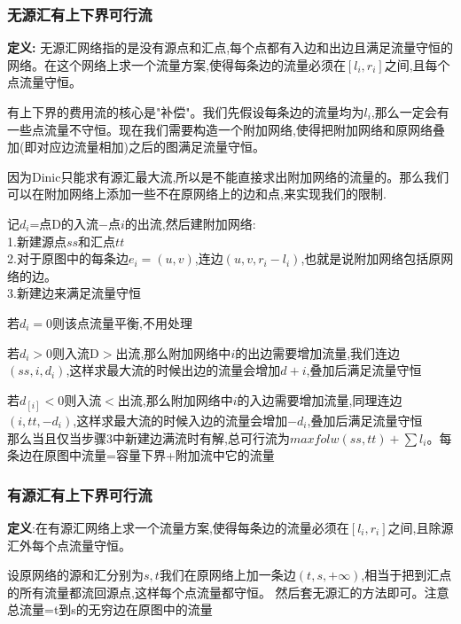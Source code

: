 \documentclass[12pt, a4paper, oneside]{ctexart}
\begin{document}
\subsubsection{无源汇有上下界可行流}
\textbf{定义:} 无源汇网络指的是没有源点和汇点,每个点都有入边和出边且满足流量守恒的网络。在这个网络上求一个流量方案,使得每条边的流量必须在$[l_{i},r_{i}]$之间,且每个点流量守恒。\par
有上下界的费用流的核心是"补偿"。我们先假设每条边的流量均为$l_{i}$,那么一定会有一些点流量不守恒。现在我们需要构造一个附加网络,使得把附加网络和原网络叠加(即对应边流量相加)之后的图满足流量守恒。\par
因为Dinic只能求有源汇最大流,所以是不能直接求出附加网络的流量的。那么我们可以在附加网络上添加一些不在原网络上的边和点,来实现我们的限制.\par
记$d_{i}$=点D的入流−点$i$的出流,然后建附加网络:\\
1.新建源点$ss$和汇点$tt$\\
2.对于原图中的每条边$e_{i}=(u,v)$,连边$(u,v,r_{i}-l_{i})$,也就是说附加网络包括原网络的边。\\
3.新建边来满足流量守恒\par
若$d_{i}=0$则该点流量平衡,不用处理\par
若$d_{i}>0$则入流D$>$出流,那么附加网络中$i$的出边需要增加流量,我们连边$(ss,i,d_{i})$,这样求最大流的时候出边的流量会增加$d+{i}$,叠加后满足流量守恒\par
若$d_[i]<0$则入流$<$出流,那么附加网络中$i$的入边需要增加流量,同理连边$(i,tt,-d_{i})$,这样求最大流的时候入边的流量会增加$-d_{i}$,叠加后满足流量守恒\\
那么当且仅当步骤3中新建边满流时有解,总可行流为$maxfolw(ss,tt)+\sum{l_{i}}$。每条边在原图中流量=容量下界+附加流中它的流量

\subsubsection{有源汇有上下界可行流}
\textbf{定义}:在有源汇网络上求一个流量方案,使得每条边的流量必须在$[l_{i},r_{i}]$之间,且除源汇外每个点流量守恒。\par
设原网络的源和汇分别为$s,t$我们在原网络上加一条边${(t,s,+\infty)}$,相当于把到汇点的所有流量都流回源点,这样每个点流量都守恒。
然后套无源汇的方法即可。注意总流量=t到s的无穷边在原图中的流量
\end{document}
